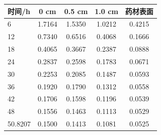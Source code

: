 \begin{tabular}{lcccc}
\toprule
时间/h & 0 cm & 0.5 cm & 1.0 cm & 药材表面 \\
\midrule
6 & 1.7164 & 1.5350 & 1.0212 & 0.4215 \\
12 & 0.7340 & 0.6516 & 0.4068 & 0.1666 \\
18 & 0.4065 & 0.3667 & 0.2387 & 0.0888 \\
24 & 0.2837 & 0.2598 & 0.1783 & 0.0671 \\
30 & 0.2253 & 0.2085 & 0.1487 & 0.0593 \\
36 & 0.1920 & 0.1790 & 0.1312 & 0.0558 \\
42 & 0.1706 & 0.1598 & 0.1196 & 0.0539 \\
48 & 0.1556 & 0.1463 & 0.1113 & 0.0529 \\
50.8207 & 0.1500 & 0.1413 & 0.1081 & 0.0525 \\
\bottomrule
\end{tabular}
